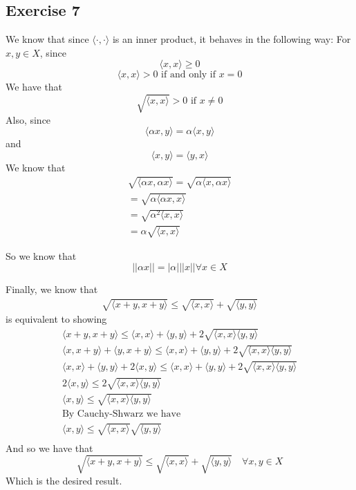 \documentclass[letterpaper,12pt]{article}
\theoremstyle{definition}
\begin{document}
\subsection*{Exercise 7}
We know that since $\langle \cdot, \cdot \rangle$ is an inner product, it behaves in the following way:
For $x,y \in X$, since
\[\langle x, x \rangle \geq 0\]
\[\langle x, x \rangle > 0 \text{ if and only if } x = 0\]
We have that
\[\sqrt{\langle x, x \rangle } > 0 \text{ if } x \neq 0\]
Also, since 
\[ \langle \alpha x, y \rangle = \alpha \langle x, y \rangle\]
and
\[ \langle x, y \rangle = \langle y, x \rangle \]
We know that
\begin{align*}
\sqrt{\langle \alpha x, \alpha x \rangle} = \sqrt{\alpha \langle x, \alpha x \rangle} 
\\= \sqrt{\alpha \langle \alpha x, x \rangle}
\\= \sqrt{\alpha^2 \langle  x, x \rangle} 
\\= \alpha \sqrt{ \langle  x, x \rangle}
\end{align*} 



So we know that
\[ ||\alpha x|| = |\alpha| ||x|| \forall x \in X\]



Finally, we know that
\begin{align*}
    \sqrt{ \langle x+y ,  x+y \rangle} \leq \sqrt{ \langle x,x \rangle} + \sqrt{ \langle y,y \rangle}
\end{align*}
is equivalent to showing
\begin{align*}
    \langle x+y, x+y \rangle \leq \langle x,x \rangle + \langle y,y \rangle+2\sqrt{\langle x,x \rangle\langle y,y \rangle}\\
    \langle x, x+y \rangle + \langle y, x+y \rangle \leq \langle x,x \rangle + \langle y,y \rangle+2\sqrt{\langle x,x \rangle\langle y,y \rangle}\\
    \langle x, x \rangle + \langle y, y \rangle + 2\langle x,y \rangle \leq \langle x,x \rangle + \langle y,y \rangle+2\sqrt{\langle x,x \rangle\langle y,y \rangle}\\
    2\langle x,y \rangle \leq 2\sqrt{\langle x,x \rangle\langle y,y \rangle}\\
    \langle x,y \rangle \leq \sqrt{\langle x,x \rangle\langle y,y \rangle}\\
    \text{By Cauchy-Shwarz we have} \\
    \langle x,y \rangle \leq \sqrt{\langle x,x \rangle}\sqrt{\langle y,y \rangle}\\
\end{align*}
And so we have that
\[ \sqrt{\langle x+y, x + y\rangle} \leq \sqrt{\langle x,x \rangle} + \sqrt{\langle y,y \rangle} \quad \forall x,y \in X \]
Which is the desired result.
\end{document}
